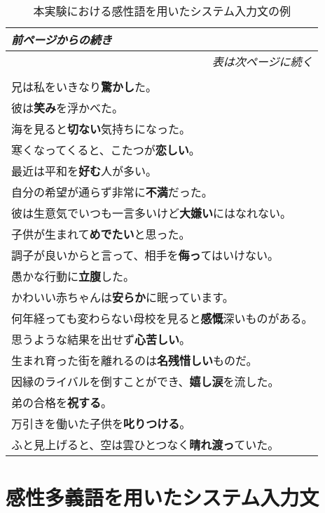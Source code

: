\begin{longtable}[C]{|l|}
	\caption{本実験における感性語を用いたシステム入力文の例}
	\label{table:kansei_input_list}
	\\
	\endfirsthead
	\multicolumn{1}{l}{\small\it 前ページからの続き}\\
 	\endhead
	\multicolumn{1}{r}{\small\it 表は次ページに続く}\\
	\endfoot
	\multicolumn{1}{r}{\small\it これで終わり}\\
 	\endlastfoot
	\hline
	兄は私をいきなり\textbf{驚かし}た。 \\
	\hline
	彼は\textbf{笑み}を浮かべた。 \\
	\hline
	海を見ると\textbf{切ない}気持ちになった。 \\
	\hline
	寒くなってくると、こたつが\textbf{恋しい}。\\
	\hline
	最近は平和を\textbf{好む}人が多い。 \\
	\hline
	自分の希望が通らず非常に\textbf{不満}だった。\\
	\hline
	彼は生意気でいつも一言多いけど\textbf{大嫌い}にはなれない。\\
	\hline
	子供が生まれて\textbf{めでたい}と思った。 \\
	\hline
	調子が良いからと言って、相手を\textbf{侮っ}てはいけない。 \\
	\hline
	愚かな行動に\textbf{立腹}した。 \\
	\hline
	かわいい赤ちゃんは\textbf{安らか}に眠っています。 \\
	\hline
	何年経っても変わらない母校を見ると\textbf{感慨}深いものがある。 \\
	\hline
	思うような結果を出せず\textbf{心苦しい}。 \\
	\hline
	生まれ育った街を離れるのは\textbf{名残惜しい}ものだ。 \\
	\hline
	因縁のライバルを倒すことができ、\textbf{嬉し涙}を流した。\\
	\hline
	弟の合格を\textbf{祝する}。 \\
	\hline
	万引きを働いた子供を\textbf{叱りつける}。 \\
	\hline
	ふと見上げると、空は雲ひとつなく\textbf{晴れ渡っ}ていた。 \\
	\hline
\end{longtable}

\newpage
\section{感性多義語を用いたシステム入力文}

